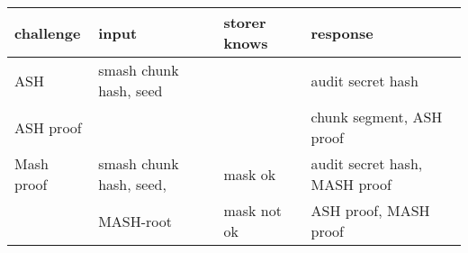 \documentclass{standalone}
\begin{document}
\begin{tabular}{|l|l|l|l|}
\hline
 \textbf{challenge} & \textbf{input} & \textbf{storer knows} & \textbf{response} \\ \hline \hline
 ASH & smash chunk hash, seed & & audit secret hash \\ \cline{1-1} \cline {4-4}
 ASH proof & & & chunk segment, ASH proof \\ \hline
 Mash proof & smash chunk hash, seed, & mask ok & audit secret hash, MASH proof \\ \cline{3-4}
  & MASH-root & mask not ok & ASH proof, MASH proof \\
  \hline
\end{tabular} 
\end{document}
